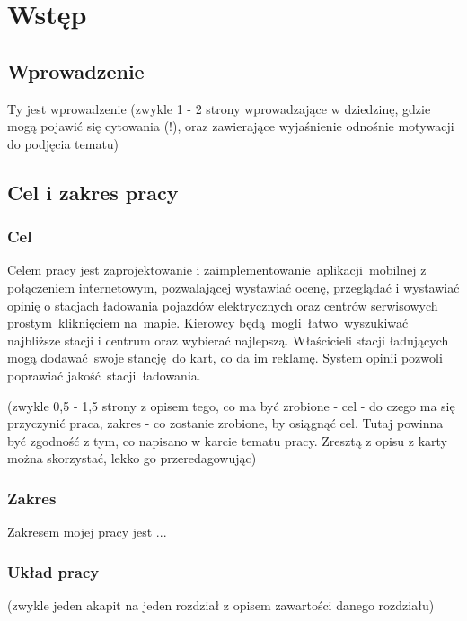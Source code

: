 \chapter{Wstęp}
\section{Wprowadzenie}
Ty jest wprowadzenie (zwykle 1 - 2 strony wprowadzające w dziedzinę, gdzie mogą pojawić się cytowania (!), oraz zawierające wyjaśnienie odnośnie motywacji do podjęcia tematu)

\section{Cel i zakres pracy}
\subsection{Cel}
Celem pracy jest zaprojektowanie i zaimplementowanie aplikacji mobilnej z połączeniem internetowym, pozwalającej wystawiać ocenę, przeglądać i wystawiać opinię o stacjach ładowania pojazdów elektrycznych oraz centrów serwisowych prostym kliknięciem na mapie. Kierowcy będą mogli łatwo wyszukiwać najbliższe stacji i centrum oraz wybierać najlepszą. Właścicieli stacji ładujących mogą dodawać swoje stancję do kart, co da im reklamę. System opinii pozwoli poprawiać jakość stacji ładowania.

(zwykle 0,5 - 1,5 strony z opisem tego, co ma być zrobione - cel - do czego ma się przyczynić praca, zakres - co zostanie zrobione, by osiągnąć cel. Tutaj powinna być zgodność z tym, co napisano w karcie tematu pracy. Zresztą  z opisu z karty można skorzystać, lekko go przeredagowując)
\subsection{Zakres}
Zakresem mojej pracy jest ...

\subsection{Układ pracy}
(zwykle jeden akapit na jeden rozdział z opisem zawartości danego rozdziału)